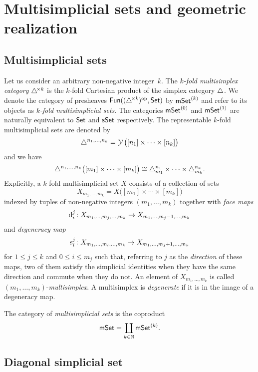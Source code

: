 
\section{Multisimplicial sets and geometric realization}


\subsection{Multisimplicial sets}

Let us consider an arbitrary non-negative integer~$k$.
The \textit{$k$-fold multisimplex category} $\triangle^{\!\times\mathit{k}}$ is the $k$-fold Cartesian product of the simplex category $\triangle$.
We denote the category of presheaves $\mathsf{Fun}((\triangle^{\!\times\mathit{k}})^{\mathrm{op}}, \mathsf{Set})$ by $\mathsf{mSet}^{(k)}$ and refer to its objects as \textit{$k$-fold multisimplicial sets}.
The categories $\mathsf{mSet}^{(0)}$ and $\mathsf{mSet}^{(1)}$ are naturally equivalent to $\mathsf{Set}$ and $\mathsf{sSet}$ respectively.
The representable $k$-fold multisimplicial sets are denoted by
\[
\triangle^{n_1, \dots, n_k} = \operatorname{\mathcal{Y}} \big( [n_1] \times \cdots \times [n_k] \big)
\]
and we have
\[
\triangle^{n_1, \dots, n_k} \big( [m_1] \times \cdots \times [m_k] \big) \cong
\triangle^{n_1}_{m_1} \times \dots \times \triangle^{n_k}_{m_k}.
\]
Explicitly, a $k$-fold multisimplicial set $X$ consists of a collection of sets
\[
X_{m_1, \dots, m_k} = X\big( [m_1] \times \cdots \times [m_k] \big)
\]
indexed by tuples of non-negative integers $(m_1, \dots, m_k)$ together with \textit{face maps}
\[
\operatorname{d}_i^j \colon
X_{m_1, \dots, m_j, \dots, m_k} \to
X_{m_1, \dots, m_j-1, \dots, m_k}
\]
and \textit{degeneracy map}
\[
\operatorname{s}^j_i \colon X_{m_1, \dots, m_l, \dots, m_k} \to X_{m_1, \dots, m_j+1, \dots, m_k}
\]
for $1 \leq j \leq k$ and $0 \leq i \leq m_j$ such that, referring to $j$ as the \textit{direction} of these maps, two of them satisfy the simplicial identities when they have the same direction and commute when they do not.
An element of $X_{m_1, \dots, m_k}$ is called 
$(m_1, \dots, m_k)$-\textit{multisimplex}.
A multisimplex is \textit{degenerate} if it is in the image of a degeneracy map.

The category of \textit{multisimplicial sets} is the coproduct
\[
\mathsf{mSet} = \coprod_{k \in \mathbb{N}} \mathsf{mSet}^{(k)}.
\]

\subsection{Diagonal simplicial set} \label{ss:diagonal simplicial set}


